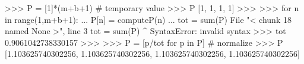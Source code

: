 
>>> P = [1]*(m+b+1) # temporary value
>>> P
[1, 1, 1, 1]
>>>
>>> for n in range(1,m+b+1):
...     P[n] = computeP(n)
... tot = sum(P)
  File "< chunk 18 named None >", line 3
    tot = sum(P)
      ^
SyntaxError: invalid syntax
>>> tot
0.9061042738330157
>>>
>>> P = [p/tot for p in P] # normalize
>>> P
[1.103625740302256, 1.103625740302256, 1.103625740302256,
1.103625740302256]

